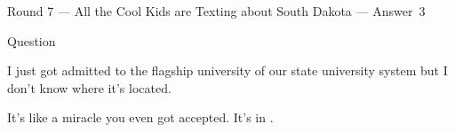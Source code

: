 \documentclass[11pt]{beamer}
\begin{document}
\begin{frame}[t]{Round 7 --- All the Cool Kids are Texting about South Dakota --- \mbox{Answer 3}}
\begin{block}{Question}

\begin{minipage}{0.9\textwidth}
\begin{mdframed}[
    roundcorner=7pt,
    backgroundcolor=black!5,
    linecolor=black!5,
    fontcolor=black,
    ignorelastdescenders]
\begin{flushleft}
{\small{}\selectfont{}
I just got admitted to the flagship university of our state university system but I don't know where it's located.
}
\end{flushleft}
\end{mdframed}
\end{minipage}

\hfill{}\begin{minipage}{0.9\textwidth}
\begin{mdframed}[
    roundcorner=7pt,
    backgroundcolor=blue!80!white,
    linecolor=blue!80!white,
    fontcolor=white,
    ignorelastdescenders]
\begin{flushleft}
{\small{}\selectfont{}
It's like a miracle you even got accepted. It's in \textunderscore{}\textunderscore{}\textunderscore{}\textunderscore{}\textunderscore{}\textunderscore{}.
}
\end{flushleft}
\end{mdframed}
\end{minipage}
\end{block}
\end{frame}
\end{document}
